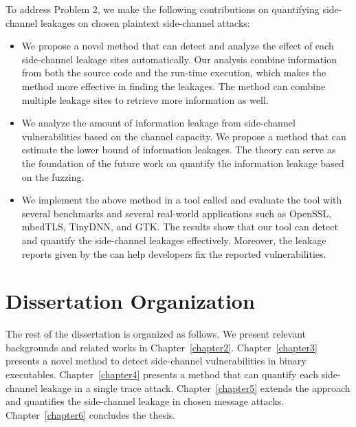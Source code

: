 To address Problem 2, we make the following contributions on quantifying side-channel leakages on chosen plaintext side-channel attacks: 
\begin{itemize}
    \item We propose a novel method that can detect and analyze the effect of each side-channel leakage sites automatically. Our analysis combine information from both the source code and the run-time execution, which makes the method more effective in finding the leakages. The method can combine multiple leakage sites to retrieve more information as well.
    \item We analyze the amount of information leakage from side-channel vulnerabilities based on the channel capacity. We propose a method that can estimate the lower bound of information leakages. The theory can serve as the foundation of the future work on quantify the information leakage based on the fuzzing.
    \item We implement the above method in a tool called \ctool{} and evaluate the tool with several benchmarks and several real-world applications such as OpenSSL, mbedTLS, TinyDNN, and GTK. The results show that our tool can detect and quantify the side-channel leakages effectively. Moreover, the leakage reports given by the \ctool{} can help developers fix the reported vulnerabilities.
\end{itemize}


\section{Dissertation Organization}
The rest of the dissertation is organized as follows. We present relevant backgrounds and related works in Chapter~\ref{chapter2}. Chapter~\ref{chapter3} presents a novel method to detect side-channel vulnerabilities in binary executables. Chapter~\ref{chapter4} presents a method that can quantify each side-channel leakage in a single trace attack. Chapter~\ref{chapter5} extends the approach and quantifies the side-channel leakage in chosen message attacks. Chapter~\ref{chapter6} concludes the thesis.